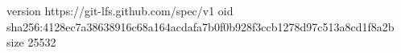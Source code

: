 version https://git-lfs.github.com/spec/v1
oid sha256:4128ec7a38638916c68a164acdafa7b0f0b928f3ccb1278d97c513a8cd1f8a2b
size 25532
